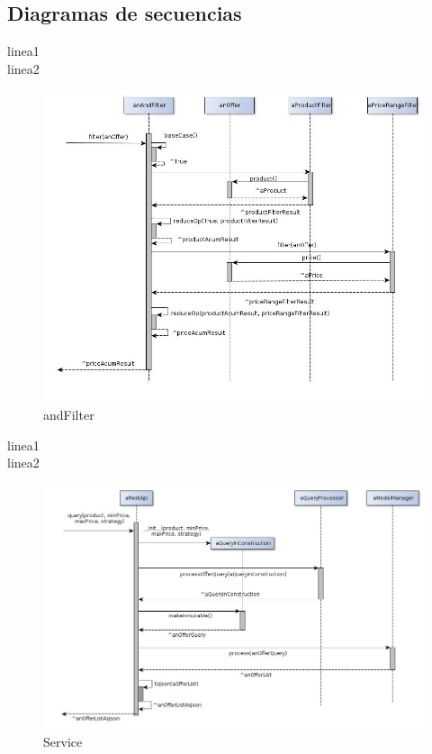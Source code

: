 \documentclass[10pt, a4paper]{article}
\begin{document}
\begin{landscape}
\subsection{Diagramas de secuencias}
linea1\\
linea2\\
\begin{figure}[H]
\centering
\includegraphics[scale=0.6]{graphics/andFilter_sequence.jpg}
\caption{andFilter}
\end{figure}
\newpage
linea1\\
linea2\\
\begin{figure}[H]
\centering
\includegraphics[scale=0.70]{graphics/service_sequence.jpg}
\caption{Service}
\end{figure}

\end{landscape}
\end{document}
